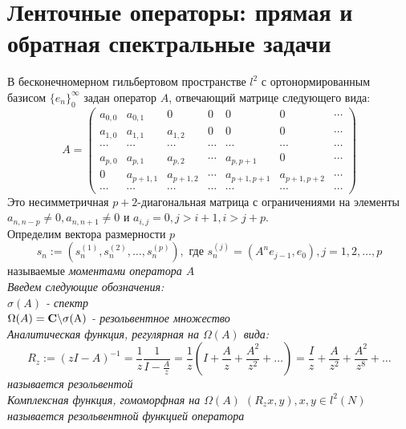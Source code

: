 \section{Ленточные операторы: прямая и обратная спектральные задачи}
В бесконечномерном гильбертовом пространстве $l^2$ с
ортонормированным базисом $\{e_n\}^\infty_0$ задан оператор $A$,
отвечающий матрице следующего вида:
\begin{equation}
\label{Operator_Matrix} A= \left(\begin{array}{ccccccc}
a_{0,0}&a_{0,1}&0&0&0&0&\cdots\\
a_{1,0}&a_{1,1}&a_{1,2}&0&0&0&\cdots\\
\cdots&\cdots&\cdots&\cdots&\cdots&\cdots&\cdots\\
a_{p,0}&a_{p,1}&a_{p,2}&\cdots&a_{p,p+1}&0&\cdots\\
0&a_{p+1,1}&a_{p+1,2}&\cdots&a_{p+1,p+1}&a_{p+1,p+2}&\cdots\\
\cdots&\cdots&\cdots&\cdots&\cdots&\cdots&\cdots
\end{array}\right)
\end{equation}
Это несимметричная $p+2$-диагональная матрица с ограничениями на
элементы $a_{n,n-p}\not=0,a_{n,n+1}\not=0$ и
$a_{i,j}=0,j>i+1,i>j+p$.\\
Определим вектора размерности $p$
\begin{equation}
\label{Moment_gector} s_n:=(s_n^{(1)},s_n^{(2)},\ldots,s_n^{(p)}),
\mbox{ где  } s_n^{(j)}=(A^ne_{j-1},e_0), j=1,2,\ldots,p
\end{equation}
называемые \it моментами оператора $A$\rm \\
Введем следующие обозначения: \\
$\sigma(A)$ - \it спектр \rm \\
$\Omega(A)=\bf C \rm \backslash\sigma(A)$ - \it резольвентное множество \rm \\
Аналитическая функция, регулярная на $\Omega(A)$ вида:
$$%
R_z:=(zI-A)^{-1}=\displaystyle\frac{1}{z}
\displaystyle\frac{1}{I-\frac{A}{z}}=\frac{1}{z}\left( I +
\frac{A}{z} +\frac{A^2}{z^2}+\ldots \right)=\frac{I}{z}
+\frac{A}{z^2}+\frac{A^2}{z^8}+\ldots
$$%
называется \it резольвентой \rm \\
Комплексная функция, гомоморфная на $\Omega(A)$
$(R_zx,y),x,y\in{l^2}(N)$ называется \it резольвентной функцией
оператора \rm \\
